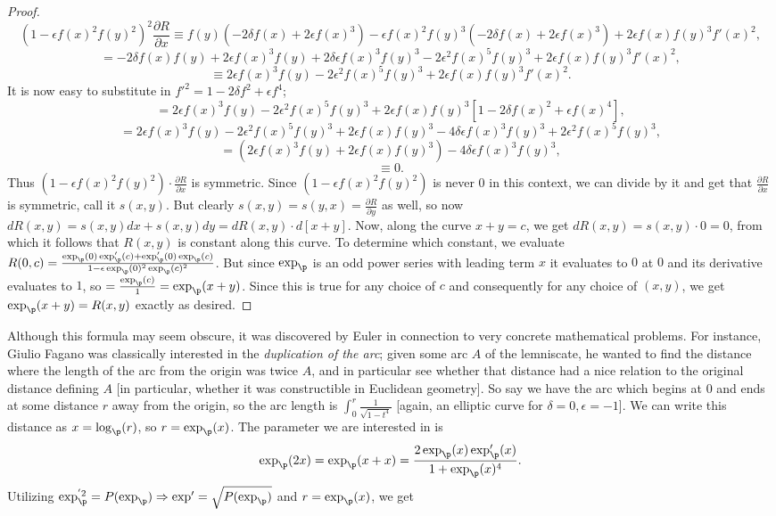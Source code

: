\begin{proof}
\[(1 - \epsilon f(x)^2 f(y)^2)^2 \frac{\partial R}{\partial x} \equiv f(y)(-2 \delta f(x) + 2 \epsilon f(x)^3)  - \epsilon f(x)^2 f(y)^3 (-2 \delta f(x) + 2 \epsilon f(x)^3)   + 2 \epsilon f(x) f(y)^3 f'(x)^2 ,\]
\[ = -2 \delta f(x) f(y) + 2 \epsilon f(x)^3 f(y) + 2 \delta \epsilon f(x)^3 f(y)^3 - 2 \epsilon^2 f(x)^5 f(y)^3 + 2 \epsilon f(x) f(y)^3 f'(x)^2 ,\]
\[ \equiv 2 \epsilon f(x)^3 f(y) - 2 \epsilon^2 f(x)^5 f(y)^3 + 2 \epsilon f(x) f(y)^3 f'(x)^2  .\]
It is now easy to substitute in $f'^2 = 1 - 2 \delta f^2 + \epsilon f^4$;
\[ =  2 \epsilon f(x)^3 f(y) - 2 \epsilon^2 f(x)^5 f(y)^3 + 2 \epsilon f(x) f(y)^3 [1 - 2 \delta f(x)^2 + \epsilon f(x)^4]  , \]
\[ =  2 \epsilon f(x)^3 f(y) - 2 \epsilon^2 f(x)^5 f(y)^3  +  2 \epsilon f(x) f(y)^3  - 4 \delta \epsilon f(x)^3 f(y)^3 + 2\epsilon^2 f(x)^5 f(y)^3, \]
\[ = (2 \epsilon f(x)^3 f(y)  +  2 \epsilon f(x) f(y)^3  ) - 4 \delta \epsilon f(x)^3 f(y)^3 ,\]
\[ \equiv 0.\]
Thus $(1 - \epsilon f(x)^2 f(y)^2) \cdot \frac{\partial R}{\partial x}$ is symmetric. Since $(1 - \epsilon f(x)^2 f(y)^2) $ is never $0$ in this context, we can divide by it and get that $\frac{\partial R}{\partial x}$ is symmetric, call it $s(x, y)$. But clearly $s(x, y) = s(y, x) = \frac{\partial R}{\partial y}$ as well, so now $dR(x, y) = s(x, y) dx + s(x, y) dy = dR(x, y) \cdot d[x + y]$. Now, along the curve $x + y = c$, we get $dR(x, y) = s(x, y) \cdot 0 = 0$, from which it follows that $R(x, y)$ is constant along this curve. To determine which constant, we evaluate $R(0, c) =  \frac{\exp_\p (0) \exp_\p' (c) + \exp_\p' (0) \exp_\p (c)    }{1 - \epsilon \exp_\p (0)^2 \exp_\p (c)^2  } $. But since $\exp_\p$ is an odd power series with leading term $x$ it evaluates to $0$ at $0$ and its derivative evaluates to $1$, so $ = \frac{\exp_\p (c)}{1} = \exp_\p (x + y)$. Since this is true for any choice of $c$ and consequently for any choice of $(x, y)$, we get $\exp_\p (x + y) = R(x, y)$ exactly as desired.
\end{proof}

Although this formula may seem obscure, it was discovered by Euler in connection to very concrete mathematical problems. For instance, Giulio Fagano was classically interested in the \textit{duplication of the arc}; given some arc $A$ of the lemniscate, he wanted to find the distance where the length of the arc from the origin was twice $A$, and in particular see whether that distance had a nice relation to the original distance defining $A$ [in particular, whether it was constructible in Euclidean geometry]. So say we have the arc which begins at $0$ and ends at some distance $r$ away from the origin, so the arc length is $\int_0^r \frac{1}{\sqrt{1 - t^4}}$  [again, an elliptic curve for $\delta = 0, \epsilon = -1$]. We can write this distance as $x = \log_\p (r)$, so $r = \exp_\p (x)$. The parameter we are interested in is 
\[\exp_\p (2x) = \exp_\p (x + x) = \frac{2\exp_\p(x) \exp_\p'(x)}{1 + \exp_\p(x)^4}.\]
Utilizing $\exp^{'2}_\p = P(\exp_\p) \Rightarrow \exp' = \sqrt{P(\exp_\p)}$ and $r = \exp_\p (x)$, we get

